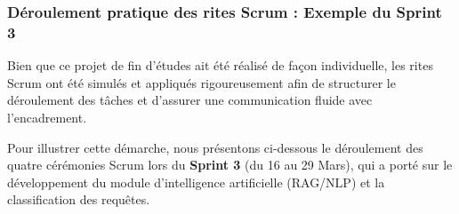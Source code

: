 \subsubsection{Déroulement pratique des rites Scrum : Exemple du Sprint 3}
\label{subsubsec:exemple_pratique_scrum}

Bien que ce projet de fin d'études ait été réalisé de façon individuelle, les rites Scrum ont été simulés et appliqués rigoureusement afin de structurer le déroulement des tâches et d'assurer une communication fluide avec l'encadrement. 

Pour illustrer cette démarche, nous présentons ci-dessous le déroulement des quatre cérémonies Scrum lors du \textbf{Sprint 3} (du 16 au 29 Mars), qui a porté sur le développement du module d'intelligence artificielle (RAG/NLP) et la classification des requêtes.

